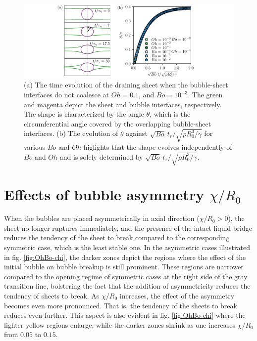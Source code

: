 \documentclass[reprint,amssymb,superscriptaddress,aps,prfluids,onecolumn]{revtex4-2}
\begin{document}
\begin{figure}[h!]
	\includegraphics{ab-time_02.pdf}
	\caption{\label{fig:ab_time}  (a) The time evolution of the draining sheet when the bubble-sheet interfaces do not coalesce at $Oh=0.1$, and $Bo=10^{-3}$. The green and magenta depict the sheet and bubble interfaces, respectively. The shape is characterized by the angle $\theta$, which is the circumferential angle covered by the overlapping bubble-sheet interfaces. (b) The evolution of $\theta$ against $ \sqrt{Bo} \ t_r/\sqrt{\rho R_0^3/\gamma}$ for various $Bo$ and $Oh$ higlights that the shape evolves independently of $Bo$ and $Oh$ and is solely determined by $ \sqrt{Bo} \ t_r/\sqrt{\rho R_0^3/\gamma}$. 
	}
\end{figure}
 
 \section{Effects of bubble asymmetry $\chi/R_0$}\label{sec:asymmetry}
When the bubbles are placed asymmetrically in axial direction ($\chi/R_0 > 0$), the sheet no longer ruptures immediately, and the presence of the intact liquid bridge reduces the tendency of the sheet to break compared to the corresponding symmetric case, which is the least stable one. 
In the asymmetric cases illustrated in fig. \ref{fig:OhBo-chi}, the darker zones depict the regions where the effect of the initial bubble on bubble breakup is still prominent. These regions are narrower compared to the opening regime of symmetric cases at the right side of the gray transition line, bolstering the fact that the addition of asymmetricity reduces the tendency of sheets to break. As $\chi/R_0$ increases, the effect of the asymmetry becomes even more pronounced. That is, the tendency of the sheets to break reduces even further. This aspect is also evident in fig. \ref{fig:OhBo-chi} where the lighter yellow regions enlarge, while the darker zones shrink as one increases $\chi/R_0$ from $0.05$ to $0.15$. 
\end{document}
